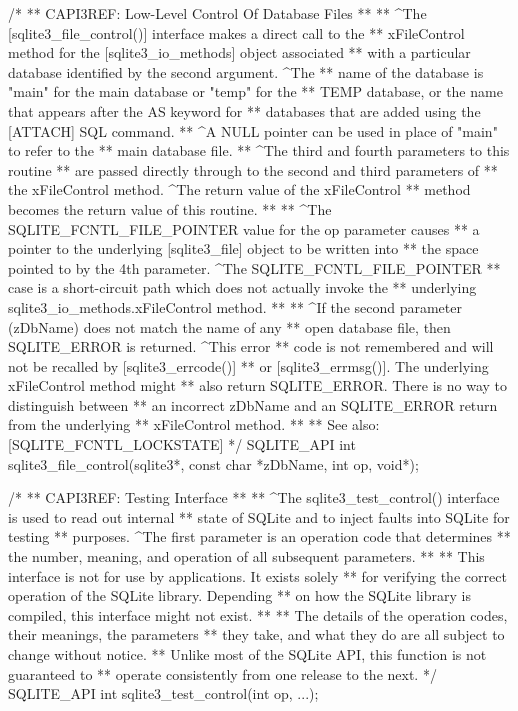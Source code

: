 \begin{Codex}[label=sqlite3.h,numbers=left]
{/*
** CAPI3REF: Low-Level Control Of Database Files
**
** ^The [sqlite3_file_control()] interface makes a direct call to the
** xFileControl method for the [sqlite3_io_methods] object associated
** with a particular database identified by the second argument. ^The
** name of the database is "main" for the main database or "temp" for the
** TEMP database, or the name that appears after the AS keyword for
** databases that are added using the [ATTACH] SQL command.
** ^A NULL pointer can be used in place of "main" to refer to the
** main database file.
** ^The third and fourth parameters to this routine
** are passed directly through to the second and third parameters of
** the xFileControl method.  ^The return value of the xFileControl
** method becomes the return value of this routine.
**
** ^The SQLITE_FCNTL_FILE_POINTER value for the op parameter causes
** a pointer to the underlying [sqlite3_file] object to be written into
** the space pointed to by the 4th parameter.  ^The SQLITE_FCNTL_FILE_POINTER
** case is a short-circuit path which does not actually invoke the
** underlying sqlite3_io_methods.xFileControl method.
**
** ^If the second parameter (zDbName) does not match the name of any
** open database file, then SQLITE_ERROR is returned.  ^This error
** code is not remembered and will not be recalled by [sqlite3_errcode()]
** or [sqlite3_errmsg()].  The underlying xFileControl method might
** also return SQLITE_ERROR.  There is no way to distinguish between
** an incorrect zDbName and an SQLITE_ERROR return from the underlying
** xFileControl method.
**
** See also: [SQLITE_FCNTL_LOCKSTATE]
*/
SQLITE_API int sqlite3_file_control(sqlite3*, const char *zDbName, int op, void*);

/*
** CAPI3REF: Testing Interface
**
** ^The sqlite3_test_control() interface is used to read out internal
** state of SQLite and to inject faults into SQLite for testing
** purposes.  ^The first parameter is an operation code that determines
** the number, meaning, and operation of all subsequent parameters.
**
** This interface is not for use by applications.  It exists solely
** for verifying the correct operation of the SQLite library.  Depending
** on how the SQLite library is compiled, this interface might not exist.
**
** The details of the operation codes, their meanings, the parameters
** they take, and what they do are all subject to change without notice.
** Unlike most of the SQLite API, this function is not guaranteed to
** operate consistently from one release to the next.
*/
SQLITE_API int sqlite3_test_control(int op, ...);

}
\end{Codex}
